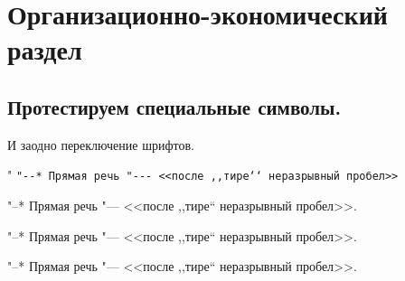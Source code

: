 \chapter{Организационно-экономический раздел}
\label{cha:econom}

\section{Протестируем специальные символы.}

И заодно переключение шрифтов.

\cite{Pup09}

{\shorthandoff" \texttt{"-{}-* Прямая речь "-{}-{}- <{}<после ,{},тире`{}` неразрывный пробел>{}>}}

{
"--* Прямая речь "--- <<после ,,тире`` неразрывный пробел>>.}

{
"--* Прямая речь "--- <<после ,,тире`` неразрывный пробел>>.}

{
"--* Прямая речь "--- <<после ,,тире`` неразрывный пробел>>.}


\blindtext
